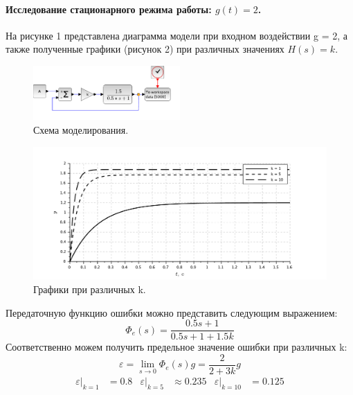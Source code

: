 \documentclass[a4paper, 11pt]{article}
\begin{document}
\paragraph{Исследование стационарного режима работы: $g(t) = 2$.}
На рисунке 1 представлена диаграмма модели при входном воздействии g = 2, а также полученные графики (рисунок 2) при различных значениях $H(s) = k$. \par
\begin{figure}[H]
    \centering
    \includegraphics[width = 0.5\textwidth]{images/model1.pdf}
    \caption{Схема моделирования.}
\end{figure}
\begin{figure}[h!]
    \centering
    \includegraphics[width = \textwidth]{images/graph1-1.pdf}
    \caption{Графики при различных k.}
\end{figure}

Передаточную функцию ошибки можно представить следующим выражением: 
\begin{equation}
    \Phi_e(s) = \frac{0.5s + 1}{0.5s + 1 + 1.5k}     
\end{equation}
Соответственно можем получить предельное значение ошибки при различных k:
\begin{equation}
    \varepsilon = \lim_{s\rightarrow 0}{\Phi_e(s)}g = \frac{2}{2 + 3k}g
\end{equation}
\begin{align*}
    \varepsilon|_{k = 1} & = 0.8 & \varepsilon|_{k = 5} & \approx 0.235 & \varepsilon|_{k = 10} & = 0.125
\end{align*}
\end{document}
